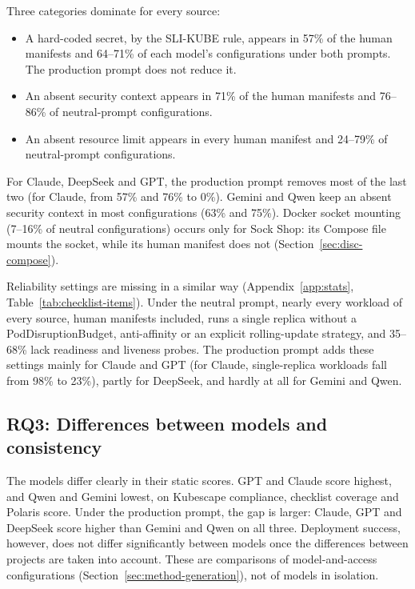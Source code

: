 

Three categories dominate for every source:
\begin{itemize}
\item A hard-coded secret, by the SLI-KUBE rule, appears in 57\% of the human manifests and 64--71\% of each model's configurations under both prompts. The production prompt does not reduce it.
\item An absent security context appears in 71\% of the human manifests and 76--86\% of neutral-prompt configurations.
\item An absent resource limit appears in every human manifest and 24--79\% of neutral-prompt configurations.
\end{itemize}
For Claude, DeepSeek and GPT, the production prompt removes most of the last two (for Claude, from 57\% and 76\% to 0\%). Gemini and Qwen keep an absent security context in most configurations (63\% and 75\%). Docker socket mounting (7--16\% of neutral configurations) occurs only for Sock Shop: its Compose file mounts the socket, while its human manifest does not (Section~\ref{sec:disc-compose}).

Reliability settings are missing in a similar way (Appendix~\ref{app:stats}, Table~\ref{tab:checklist-items}). Under the neutral prompt, nearly every workload of every source, human manifests included, runs a single replica without a PodDisruptionBudget, anti-affinity or an explicit rolling-update strategy, and 35--68\% lack readiness and liveness probes. The production prompt adds these settings mainly for Claude and GPT (for Claude, single-replica workloads fall from 98\% to 23\%), partly for DeepSeek, and hardly at all for Gemini and Qwen.

\subsection{RQ3: Differences between models and consistency}\label{sec:res-rq3}

The models differ clearly in their static scores. GPT and Claude score highest, and Qwen and Gemini lowest, on Kubescape compliance, checklist coverage and Polaris score. Under the production prompt, the gap is larger: Claude, GPT and DeepSeek score higher than Gemini and Qwen on all three. Deployment success, however, does not differ significantly between models once the differences between projects are taken into account. These are comparisons of model-and-access configurations (Section~\ref{sec:method-generation}), not of models in isolation.

